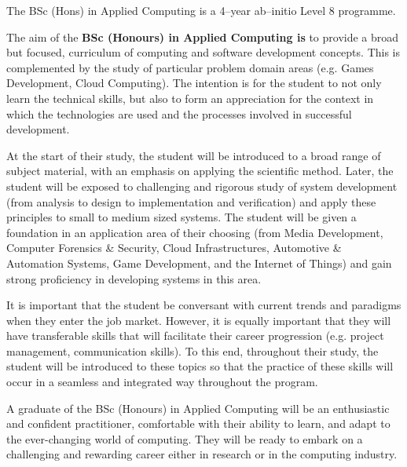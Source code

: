 

\vspace{-40pt}

The BSc (Hons) in Applied Computing is a 4--year ab--initio Level 8 programme.

\vspace{0.25cm}
\begin{programmeAim}{The aim of the \textbf{BSc (Honours) in Applied Computing is}} to provide a broad but focused, curriculum of computing and software development concepts. This is complemented by the study of particular problem domain areas (e.g. Games Development, Cloud Computing). The intention is for the student to not only learn the technical skills, but also to form an appreciation for the context in which the technologies are used and the processes involved in successful development. 

At the start of their study, the student will be introduced to a broad range of subject material, with an emphasis on applying the scientific method. Later, the student will be exposed to challenging and rigorous study of system development (from analysis to design to implementation and verification) and apply these principles to small to medium sized systems. The student will be given a foundation in an application area of their choosing (from Media Development, Computer Forensics \& Security, Cloud Infrastructures, Automotive \& Automation Systems, Game Development,  and the Internet of Things) and gain strong proficiency in developing systems in this area. 

It is important that the student be conversant with current trends and paradigms when they enter the job market. However, it is equally important that they will have transferable skills that will facilitate their career progression (e.g. project management, communication skills). To this end, throughout their study, the student will be introduced to these topics so that the practice of these skills will occur in a seamless and integrated way throughout the program. 

A graduate of the BSc (Honours) in Applied Computing will be an enthusiastic and confident practitioner, comfortable with their ability to learn, and adapt to the ever-changing world of computing. They will be ready to embark on a challenging and rewarding career either in research or in the computing industry.
\end{programmeAim}

